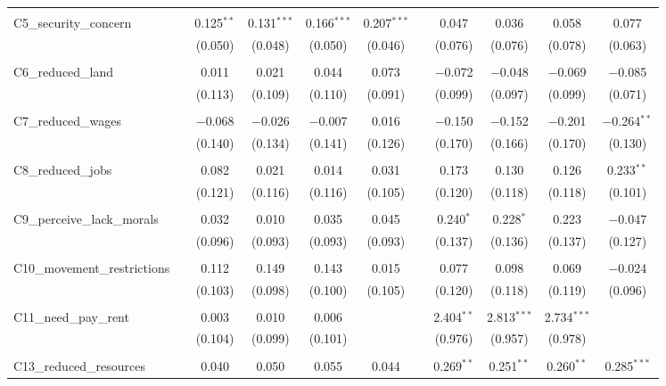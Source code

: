 \begin{table}[H]
\begin{tabular}{@{\extracolsep{4pt}}lcccccccccc}
  & & & & & & & & & & \\ 
 C5\_security\_concern &  & 0.125$^{**}$ & 0.131$^{***}$ & 0.166$^{***}$ & 0.207$^{***}$ &  & 0.047 & 0.036 & 0.058 & 0.077 \\ 
  &  & (0.050) & (0.048) & (0.050) & (0.046) &  & (0.076) & (0.076) & (0.078) & (0.063) \\ 
  & & & & & & & & & & \\ 
 C6\_reduced\_land &  & 0.011 & 0.021 & 0.044 & 0.073 &  & $-$0.072 & $-$0.048 & $-$0.069 & $-$0.085 \\ 
  &  & (0.113) & (0.109) & (0.110) & (0.091) &  & (0.099) & (0.097) & (0.099) & (0.071) \\ 
  & & & & & & & & & & \\ 
 C7\_reduced\_wages &  & $-$0.068 & $-$0.026 & $-$0.007 & 0.016 &  & $-$0.150 & $-$0.152 & $-$0.201 & $-$0.264$^{**}$ \\ 
  &  & (0.140) & (0.134) & (0.141) & (0.126) &  & (0.170) & (0.166) & (0.170) & (0.130) \\ 
  & & & & & & & & & & \\ 
 C8\_reduced\_jobs &  & 0.082 & 0.021 & 0.014 & 0.031 &  & 0.173 & 0.130 & 0.126 & 0.233$^{**}$ \\ 
  &  & (0.121) & (0.116) & (0.116) & (0.105) &  & (0.120) & (0.118) & (0.118) & (0.101) \\ 
  & & & & & & & & & & \\ 
 C9\_perceive\_lack\_morals &  & 0.032 & 0.010 & 0.035 & 0.045 &  & 0.240$^{*}$ & 0.228$^{*}$ & 0.223 & $-$0.047 \\ 
  &  & (0.096) & (0.093) & (0.093) & (0.093) &  & (0.137) & (0.136) & (0.137) & (0.127) \\ 
  & & & & & & & & & & \\ 
 C10\_movement\_restrictions &  & 0.112 & 0.149 & 0.143 & 0.015 &  & 0.077 & 0.098 & 0.069 & $-$0.024 \\ 
  &  & (0.103) & (0.098) & (0.100) & (0.105) &  & (0.120) & (0.118) & (0.119) & (0.096) \\ 
  & & & & & & & & & & \\ 
 C11\_need\_pay\_rent &  & 0.003 & 0.010 & 0.006 &  &  & 2.404$^{**}$ & 2.813$^{***}$ & 2.734$^{***}$ &  \\ 
  &  & (0.104) & (0.099) & (0.101) &  &  & (0.976) & (0.957) & (0.978) &  \\ 
  & & & & & & & & & & \\ 
 C13\_reduced\_resources &  & 0.040 & 0.050 & 0.055 & 0.044 &  & 0.269$^{**}$ & 0.251$^{**}$ & 0.260$^{**}$ & 0.285$^{***}$ \\ 

\end{tabular}
\end{table}
